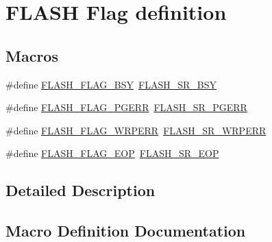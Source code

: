 \hypertarget{group___f_l_a_s_h___flag__definition}{}\section{F\+L\+A\+SH Flag definition}
\label{group___f_l_a_s_h___flag__definition}
\subsection*{Macros}
\begin{DoxyCompactItemize}
\item 
\#define \hyperlink{group___f_l_a_s_h___flag__definition_gad3bc368f954ad7744deda3315da2fff7}{F\+L\+A\+S\+H\+\_\+\+F\+L\+A\+G\+\_\+\+B\+SY}~\hyperlink{group___peripheral___registers___bits___definition_ga4b86181a96fd2f1cc3828e9d8d83d368}{F\+L\+A\+S\+H\+\_\+\+S\+R\+\_\+\+B\+SY}
\item 
\#define \hyperlink{group___f_l_a_s_h___flag__definition_gae2ef62dee0a5ca01e6226746039b6f20}{F\+L\+A\+S\+H\+\_\+\+F\+L\+A\+G\+\_\+\+P\+G\+E\+RR}~\hyperlink{group___peripheral___registers___bits___definition_ga60f40ca765714598a62aa216a5ccd8e4}{F\+L\+A\+S\+H\+\_\+\+S\+R\+\_\+\+P\+G\+E\+RR}
\item 
\#define \hyperlink{group___f_l_a_s_h___flag__definition_ga6abf64f916992585899369166db3f266}{F\+L\+A\+S\+H\+\_\+\+F\+L\+A\+G\+\_\+\+W\+R\+P\+E\+RR}~\hyperlink{group___peripheral___registers___bits___definition_gabf6f52f59b01530928d747cf32bd4d01}{F\+L\+A\+S\+H\+\_\+\+S\+R\+\_\+\+W\+R\+P\+E\+RR}
\item 
\#define \hyperlink{group___f_l_a_s_h___flag__definition_gaf043ba4d8f837350bfc7754a99fae5a9}{F\+L\+A\+S\+H\+\_\+\+F\+L\+A\+G\+\_\+\+E\+OP}~\hyperlink{group___peripheral___registers___bits___definition_gae1301c6b487cfefa247c54a576a0c12b}{F\+L\+A\+S\+H\+\_\+\+S\+R\+\_\+\+E\+OP}
\end{DoxyCompactItemize}


\subsection{Detailed Description}


\subsection{Macro Definition Documentation}
\mbox{\label{group___f_l_a_s_h___flag__definition_gad3bc368f954ad7744deda3315da2fff7}} 
